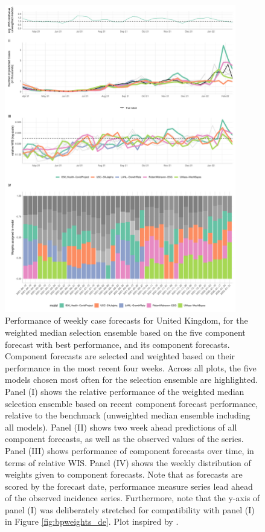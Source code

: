 \begin{figure}
\centering
\includegraphics[width = 0.9\textwidth]{../plots/best_performers_weights_gbdeaths}
\caption{\footnotesize{Performance of weekly case forecasts for United Kingdom, for the weighted median selection ensemble based on the five component forecast with best performance, and its component forecasts. Component forecasts are selected and weighted based on their performance in the most recent four weeks. Across all plots, the five models chosen most often for the selection ensemble are highlighted. Panel (I) shows the relative performance of the weighted median selection ensemble based on recent component forecast performance, relative to the benchmark (unweighted median ensemble including all models). Panel (II) shows two week ahead predictions of all component forecasts, as well as the observed values of the series. Panel (III) shows performance of component forecasts over time, in terms of relative WIS. Panel (IV) shows the weekly distribution of weights given to component forecasts. Note that as forecasts are scored by the forecast date, performance measure series lead ahead of the observed incidence series. Furthermore, note that the y-axis of panel (I) was deliberately stretched for compatibility with panel (I) in Figure \ref{fig:bpweights_de}. Plot inspired by \cite{ray_comparing_2022}.}}
\label{fig:bpweights_gbdeaths}
\end{figure}
